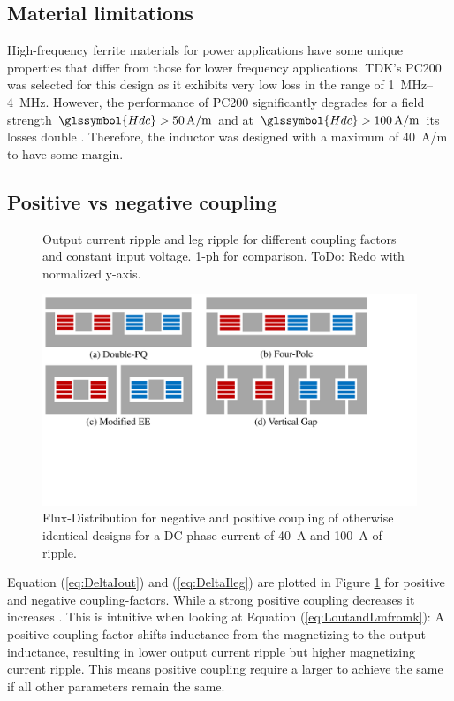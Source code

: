 \documentclass{IPEC2026}
\newcommand{\sbl}[1]{\glssymbol{#1}}
\begin{document}
\subsection{Material limitations}
High-frequency ferrite materials for power applications have some unique properties that differ from those for lower frequency applications. TDK's PC200 was selected for this design as it exhibits very low loss in the range of \qtyrange{1}{4}{\MHz}. However, the performance of PC200 significantly degrades for a field strength $\sbl{Hdc} > \qty{50}{A/m}$ and at $\sbl{Hdc} > \qty{100}{A/m}$ its losses double \cite{tdkHighFrequencyLowLossFerrite}. Therefore, the inductor was designed with a maximum \sbl{Hdc} of \qty{40}{A/m} to have some margin.

\subsection{Positive vs negative coupling}
\begin{figure}
  \centering
  
  
  \caption{Output current ripple and leg ripple for different coupling factors and constant input voltage. 1-ph for comparison. ToDo: Redo with normalized y-axis.}
  \label{fig:OutputAndLegRipple}
\end{figure}
\begin{figure}
  \includegraphics[page=3, trim = 0cm 1cm 3.5cm 0cm, clip, width=\columnwidth]{figures/IPEC_Figures_PowerPoint.pdf}
  \caption{Flux-Distribution for negative and positive coupling of otherwise identical designs for a DC phase current of \qty{40}{\A} and \qty{100}{\A} of ripple.}
  \label{fig:Fluxposneg}
\end{figure}
Equation (\ref{eq:DeltaIout}) and (\ref{eq:DeltaIleg}) are plotted in Figure \ref{fig:OutputAndLegRipple} for positive and negative coupling-factors. While a strong positive coupling decreases \sbl{DeltaIout} it increases \sbl{DeltaIleg}. This is intuitive when looking at Equation (\ref{eq:LoutandLmfromk}): A positive coupling factor shifts inductance from the magnetizing to the output inductance, resulting in lower output current ripple but higher magnetizing current ripple. This means positive coupling require a larger \sbl{Lself} to achieve the same \sbl{Ion} if all other parameters remain the same. \par
\end{document}

